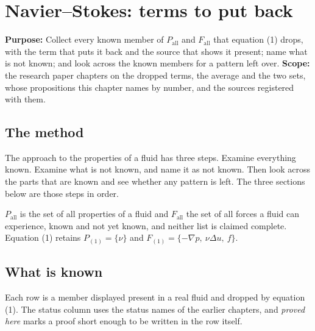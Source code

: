 \chapter{Navier--Stokes: terms to put back}

\textbf{Purpose:} Collect every known member of $P_{\mathrm{all}}$ and $F_{\mathrm{all}}$ that
equation (1) drops, with the term that puts it back and the source that shows it present; name what
is not known; and look across the known members for a pattern left over. \textbf{Scope:} the
research paper chapters on the dropped terms, the average and the two sets, whose propositions this
chapter names by number, and the sources registered with them.

\section{The method}

The approach to the properties of a fluid has three steps. Examine everything known. Examine what
is not known, and name it as not known. Then look across the parts that are known and see whether
any pattern is left. The three sections below are those steps in order.

$P_{\mathrm{all}}$ is the set of all properties of a fluid and $F_{\mathrm{all}}$ the set of all
forces a fluid can experience, known and not yet known, and neither list is claimed complete.
Equation (1) retains $P_{(1)} = \{\nu\}$ and $F_{(1)} = \{-\nabla p,\ \nu\Delta u,\ f\}$.

\section{What is known}

Each row is a member displayed present in a real fluid and dropped by equation (1). The status column
uses the status names of the earlier chapters, and \emph{proved here} marks a proof short enough to be
written in the row itself.

